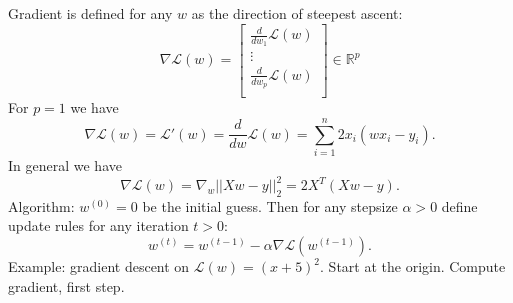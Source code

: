 \documentclass{article}
\begin{document}
Gradient is defined for any $w$ as the direction of steepest ascent:
\begin{equation}
  \nabla \mathcal L(w) = \left[\begin{array}{c}
              \frac{d}{dw_1} \mathcal L(w)\\
              \vdots \\
              \frac{d}{dw_p} \mathcal L(w)\\
\end{array}\right]\in\mathbb R^{p}
\end{equation}
For $p=1$ we have 
\begin{equation}
  \nabla \mathcal L(w) = \mathcal L'(w) = \frac{d}{dw}\mathcal L(w) = 
  \sum_{i=1}^n 2x_i(w x_i - y_i).
\end{equation}
In general we have
\begin{equation}
  \nabla \mathcal L(w) = 
  \nabla_w ||Xw - y||_2^2 = 
  2X^T(Xw-y).
\end{equation}
Algorithm: $w^{(0)}=0$ be the initial guess.
Then for any stepsize $\alpha>0$ define update rules for any iteration $t>0$:
\begin{equation}
  w^{(t)} = w^{(t-1)} - \alpha \nabla \mathcal L(w^{(t-1)}).
\end{equation}
Example: gradient descent on $\mathcal L(w)=(x+5)^2$. Start at the
origin. Compute gradient, first step.
\end{document}
